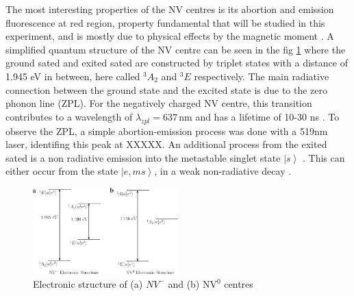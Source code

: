 The most interesting properties of the NV centres is its abortion and emission fluorescence at red region, property fundamental that will be studied in this experiment, and is mostly due to physical effects by the magnetic moment \cite{jelezko_single_2006}. A simplified quantum structure of the NV centre can be seen in the fig \ref{fig:nvcentres} where the ground sated and exited sated are constructed by triplet states with a distance of 1.945 eV in between, here called $^{3}A_{2}$ and $^{3}E$  respectively. The main radiative connection between the ground state and the excited state is due to the zero phonon line (ZPL). For the negatively charged NV centre, this transition contributes to a wavelength of $\lambda_{zpl} = 637\,\mathrm{nm}$ and has a lifetime of 10-30 ns \cite{schirhagl_nitrogen-vacancy_2014}. To observe the ZPL, a simple abortion-emission process was done with a 519nm laser, identifing this peak at XXXXX.
An additional process from the exited sated is a non radiative emission into the metastable singlet state $\left|s\right\rangle$ . This can either occur from the state $\left| e,ms\right\rangle$, in a weak non-radiative decay \cite{pham_magnetic_nodate}.



\begin{figure}
	
	\centering
	\includegraphics[width=0.5\textwidth]{../figures/nv-centre.png}
	\caption{Electronic structure of (a) $NV^-$ and (b) NV$^0$ centres \cite{doherty}}
	\label{fig:nvcentres}
\end{figure}


